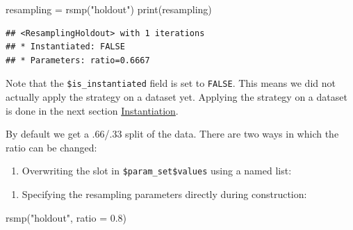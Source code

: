\documentclass[
]{scrbook}
\newenvironment{Shaded}{\begin{snugshade}}{\end{snugshade}}
\newcommand{\AttributeTok}[1]{\textcolor[rgb]{0.77,0.63,0.00}{#1}}
\newcommand{\FloatTok}[1]{\textcolor[rgb]{0.00,0.00,0.81}{#1}}
\newcommand{\FunctionTok}[1]{\textcolor[rgb]{0.00,0.00,0.00}{#1}}
\newcommand{\NormalTok}[1]{#1}
\newcommand{\OtherTok}[1]{\textcolor[rgb]{0.56,0.35,0.01}{#1}}
\newcommand{\SpecialCharTok}[1]{\textcolor[rgb]{0.00,0.00,0.00}{#1}}
\newcommand{\StringTok}[1]{\textcolor[rgb]{0.31,0.60,0.02}{#1}}
\providecommand{\tightlist}{%
  \setlength{\itemsep}{0pt}\setlength{\parskip}{0pt}}
\renewenvironment{Shaded} {\begin{snugshade}\small} {\end{snugshade}}
\begin{document}
\begin{Shaded}
\begin{Highlighting}[]
\NormalTok{resampling }\OtherTok{=} \FunctionTok{rsmp}\NormalTok{(}\StringTok{"holdout"}\NormalTok{)}
\FunctionTok{print}\NormalTok{(resampling)}
\end{Highlighting}
\end{Shaded}

\begin{verbatim}
## <ResamplingHoldout> with 1 iterations
## * Instantiated: FALSE
## * Parameters: ratio=0.6667
\end{verbatim}

Note that the \texttt{\$is\_instantiated} field is set to \texttt{FALSE}.
This means we did not actually apply the strategy on a dataset yet.
Applying the strategy on a dataset is done in the next section \protect\hyperlink{resampling-inst}{Instantiation}.

By default we get a .66/.33 split of the data.
There are two ways in which the ratio can be changed:

\begin{enumerate}
\def\labelenumi{\arabic{enumi}.}
\tightlist
\item
  Overwriting the slot in \texttt{\$param\_set\$values} using a named list:
\end{enumerate}

\begin{Shaded}
\end{Shaded}

\begin{enumerate}
\def\labelenumi{\arabic{enumi}.}
\setcounter{enumi}{1}
\tightlist
\item
  Specifying the resampling parameters directly during construction:
\end{enumerate}

\begin{Shaded}
\begin{Highlighting}[]
\FunctionTok{rsmp}\NormalTok{(}\StringTok{"holdout"}\NormalTok{, }\AttributeTok{ratio =} \FloatTok{0.8}\NormalTok{)}
\end{Highlighting}
\end{Shaded}
\end{document}
